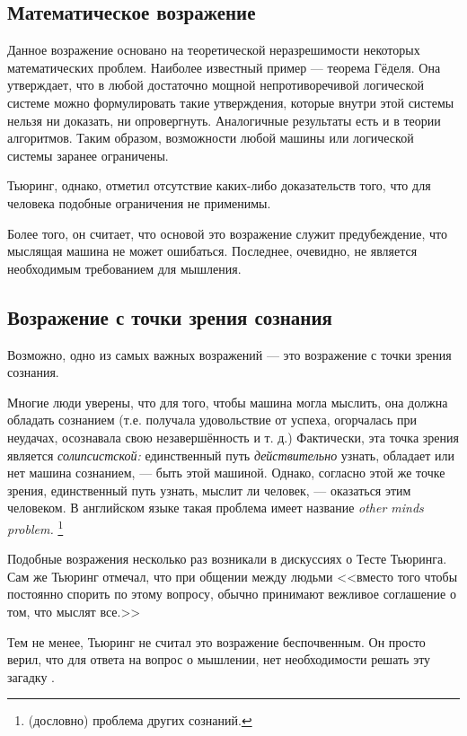 \documentclass[a4paper,14pt]{scrartcl}
\begin{document}
\subsection{Математическое возражение}

Данное возражение основано на теоретической неразрешимости некоторых математических проблем. Наиболее известный пример — теорема Гёделя. Она утверждает, что в любой достаточно мощной непротиворечивой логической системе можно формулировать такие утверждения, которые внутри этой системы нельзя ни доказать, ни опровергнуть. Аналогичные результаты есть и в теории алгоритмов. Таким образом, возможности любой машины или логической системы заранее ограничены. 

Тьюринг, однако, отметил отсутствие каких-либо доказательств того, что для человека подобные ограничения не применимы.

Более того, он считает, что основой это возражение служит предубеждение, что мыслящая машина не может ошибаться. Последнее, очевидно, не является необходимым требованием для мышления.

\subsection{Возражение с точки зрения сознания}

Возможно, одно из самых важных возражений — это возражение с точки зрения сознания.

Многие люди уверены, что для того, чтобы машина могла мыслить, она должна обладать сознанием (т.е. получала удовольствие от успеха, огорчалась при неудачах, осознавала свою незавершённость и т. д.) Фактически, эта точка зрения является {\it солипсистской:} единственный путь {\it действительно} узнать, обладает или нет машина сознанием, — быть этой машиной. Однако, согласно этой же точке зрения, единственный путь узнать, мыслит ли человек, — оказаться этим человеком. В английском языке такая проблема имеет название {\it other minds problem.} \footnote{(дословно) проблема других сознаний.}

Подобные возражения несколько раз возникали в дискуссиях о Тесте Тьюринга. Сам же Тьюринг отмечал, что при общении между людьми <<вместо того чтобы постоянно спорить по этому вопросу, обычно принимают вежливое соглашение о том, что мыслят все.>>

Тем не менее, Тьюринг не считал это возражение беспочвенным. Он просто верил, что для ответа на вопрос о мышлении, нет необходимости решать эту загадку \cite[стр. 447]{turing_1950}.
\end{document}
